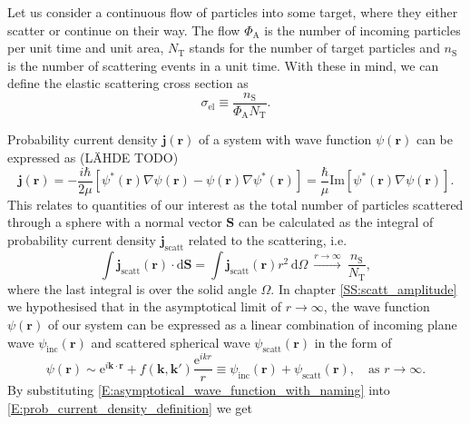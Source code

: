 \documentclass[a4paper, twoside, english, 12pt]{article}
\begin{document}
Let us consider a continuous flow of particles into some target, where they either scatter or continue on their way. The flow $\Phi_\text{A}$ is the number of incoming particles per unit time  and unit area, $N_{\text{T}}$ stands for the number of target particles and $n_\text{S}$ is the number of scattering events in a unit time. With these in mind, we can define the elastic scattering cross section as
\begin{equation}\label{E:cross_sections_definition}
	\sigma_{\text{el}} \equiv \frac{n_\text{S}}{\Phi_\text{A}N_{\text{T}}}.
\end{equation}

Probability current density $\mathbf{j}(\mathbf{r})$ of a system with wave function $\psi(\mathbf{r})$ can be expressed as (LÄHDE TODO)
\begin{equation}\label{E:prob_current_density_definition}
	\mathbf{j}(\mathbf{r}) = -\frac{i\hbar}{2\mu}\left[\psi^*(\mathbf{r})\nabla\psi(\mathbf{r}) - \psi(\mathbf{r})\nabla\psi^*(\mathbf{r})\right] = \frac{\hbar}{\mu}\text{Im}\left[\psi^*(\mathbf{r})\nabla\psi(\mathbf{r})\right].
\end{equation}
This relates to quantities of our interest as the total number of particles scattered through a sphere with a normal vector $\mathbf{S}$ can be calculated as the integral of probability current density $\mathbf{j}_{\text{scatt}}$ related to the scattering, i.e.
\begin{equation}\label{E:n:o_particles_through_sphere}
	\int \mathbf{j}_{\text{scatt}}(\mathbf{r}) \cdot \text{d}\mathbf{S} = \int \mathbf{j}_{\text{scatt}}(\mathbf{r}) r^2 \, \text{d}\Omega \: \xrightarrow{r\rightarrow\infty} \: \frac{n_\text{S}}{N_{\text{T}}},
\end{equation}
where the last integral is over the solid angle $\Omega$. In chapter \ref{SS:scatt_amplitude} we hypothesised that in the asymptotical limit of $r\rightarrow\infty$, the wave function $\psi(\mathbf{r})$ of our system can be expressed as a linear combination of incoming plane wave $\psi_{\text{inc}}(\mathbf{r})$ and scattered spherical wave $\psi_{\text{scatt}}(\mathbf{r})$ in the form of 
\begin{equation}\label{E:asymptotical_wave_function_with_naming}
\psi(\mathbf{r}) \sim \text{e}^{i\mathbf{k}\cdot\mathbf{r}} + f(\mathbf{k},\mathbf{k'})\frac{\text{e}^{ikr}}{r} \equiv \psi_{\text{inc}}(\mathbf{r}) + \psi_{\text{scatt}}(\mathbf{r}), \quad \text{as} \,\, r\rightarrow\infty.
\end{equation}
By substituting \eqref{E:asymptotical_wave_function_with_naming} into \eqref{E:prob_current_density_definition} we get
\end{document}
